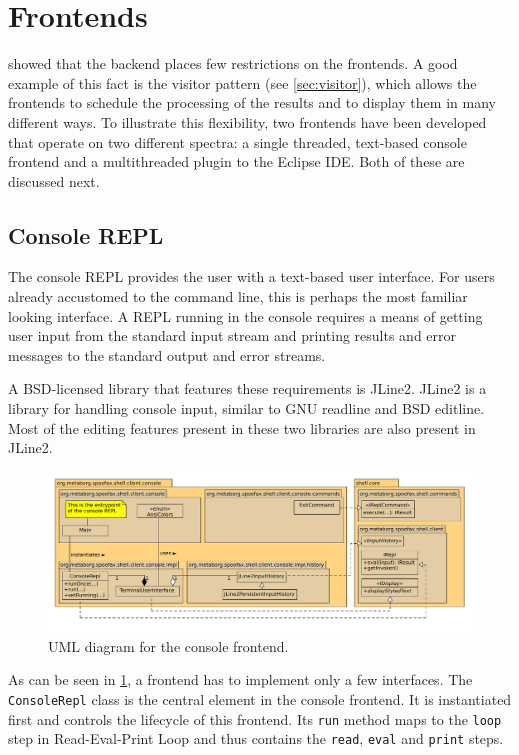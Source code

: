 \section{Frontends}
\label{sec:frontends}

 showed that the backend places few restrictions on the
frontends. A good example of this fact is the visitor pattern (see
\cref{sec:visitor}), which allows the frontends to schedule the processing of
the results and to display them in many different ways.  To illustrate this
flexibility, two frontends have been developed that operate on two different
spectra: a single threaded, text-based console frontend and a multithreaded
plugin to the Eclipse IDE. Both of these are discussed next.

\subsection{Console REPL}
\label{ssec:consolerepl}

The console REPL provides the user with a text-based user interface. For users
already accustomed to the command line, this is perhaps the most familiar
looking interface. A REPL running in the console requires a means of getting
user input from the standard input stream and printing results and error
messages to the standard output and error streams.

A BSD-licensed library that features these requirements is JLine2.
JLine2 is a library for handling console input, similar to GNU readline and BSD
editline. Most of the editing features present in these two libraries are also
present in JLine2.

\begin{figure}[h]
  \includegraphics[width=\textwidth]{uml-console}
  \caption{UML diagram for the console frontend.}
  \label{fig:uml-console}
\end{figure}

As can be seen in \cref{fig:uml-console}, a frontend has to implement only a few
interfaces. The \texttt{ConsoleRepl} class is the central element in the
console frontend. It is instantiated first and controls the lifecycle of this
frontend. Its \texttt{run} method maps to the \texttt{loop} step in
Read-Eval-Print Loop and thus contains the \texttt{read}, \texttt{eval} and
\texttt{print} steps.

